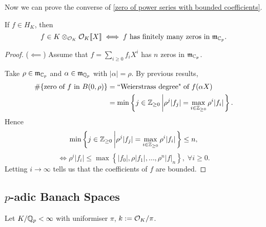 Now we can prove the converse of \cref{zero of power series with bounded coefficients}.
\begin{theorem}\label{power series bounded iff has finite zeros in open unit disk}
    If $f\in H_K$, then\[f\in K\otimes_{\mathcal{O}_K}\mathcal{O}_K\llbracket X \rrbracket\iff f\text{ has finitely many zeros in }\mathfrak{m}_{\mathbb{C}_p}.\]
\end{theorem}
\begin{proof}
    ($\impliedby$)
    Assume that $f = \sum_{i\ge 0}f_iX^i$ has $n$ zeros in $\mathfrak{m}_{\mathbb{C}_p}$.

    Take $\rho\in \mathfrak{m}_{\mathbb{C}_p}$ and $\alpha\in \mathfrak{m}_{\mathbb{Q}_p}$ with $|\alpha| = \rho$.
    By previous results, \begin{align*}
        \# \{\text{zero of } f\text{ in }B(0, \rho)\} &
        = \text{``Weierstrass degree" of } f(\alpha X)\\ &
        = \min\left\{j\in\mathbb{Z}_{\ge 0}\left| \rho^j|f_j| = \max_{i\in\mathbb{Z}_{\ge 0}}\rho^i|f_i|\right.\right\}.
    \end{align*}
    Hence \[\min\left\{j\in\mathbb{Z}_{\ge 0}\left| \rho^j|f_j| = \max_{i\in\mathbb{Z}_{\ge 0}}\rho^i|f_i|\right.\right\}\le n,\]
    \[\iff \rho^i|f_i|\le \max \left\{|f_0|, \rho|f_1|,\dots, \rho^n|f|_n\right\},\; \forall i\ge 0.\]
    Letting $i\to\infty$ tells us that the coefficients of $f$ are bounded.
\end{proof}

\subsection{\texorpdfstring{$p$-adic Banach Spaces}{}}
Let $K/\mathbb{Q}_p < \infty$ with uniformiser $\pi$, $k := \mathcal{O}_K/\pi$.
